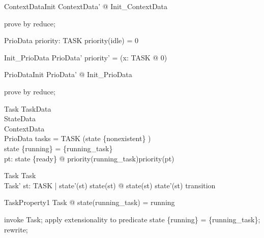 \documentclass[a4paper, 12pt]{article}
\begin{document}
\begin{theorem}{ContextDataInit}
\exists  ContextData' @ Init\_ContextData
\end{theorem}

\begin{zproof}[ContextDataInit]
prove by reduce;
\end{zproof}

\begin{schema}{PrioData}
  priority: TASK \fun  \nat 
\where
  priority(idle) = 0
\end{schema}

\begin{schema}{Init\_PrioData}
  PrioData'
\where
  priority' = (\lambda  x: TASK @ 0)
\end{schema}

\begin{theorem}{PrioDataInit}
\exists  PrioData' @ Init\_PrioData
\end{theorem}

\begin{zproof}[PrioDataInit]
prove by reduce;
\end{zproof}

\begin{schema}{Task}
  TaskData\\
  StateData\\
  ContextData\\
  PrioData
\where
  tasks = TASK \setminus  (state \inv  \limg  \{nonexistent\} \rimg )\\
  state \inv  \limg  \{running\} \rimg  = \{running\_task\}\\
  \forall  pt: state \inv  \limg  \{ready\} \rimg  @ priority(running\_task)\geq  priority(pt)
\end{schema}

\begin{schema}{\Delta Task}
  Task\\
  Task'
\where
  \forall  st: TASK | state'(st) \neq  state(st) @ state(st) \mapsto  state'(st) \in  transition
\end{schema}

\begin{theorem}{TaskProperty1}
\forall  Task @ state(running\_task) = running
\end{theorem}

\begin{zproof}[TaskProperty1]
invoke Task;
apply extensionality to predicate state \inv  \limg  \{running\} \rimg  = \{running\_task\};
rewrite;
\end{zproof}
\end{document}
